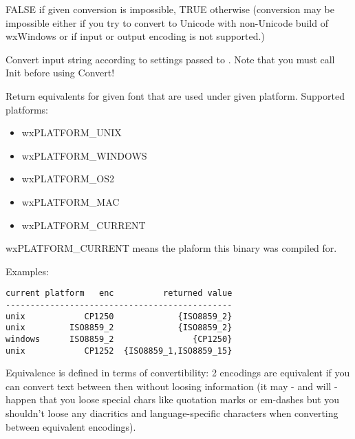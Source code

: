 
FALSE if given conversion is impossible, TRUE otherwise
(conversion may be impossible either if you try to convert
to Unicode with non-Unicode build of wxWindows or if input
or output encoding is not supported.)


\label{wxencodingconverterconvert}





Convert input string according to settings passed to .
Note that you must call Init before using Convert!



\label{wxencodingconvertergetplatformequivalents}


Return equivalents for given font that are used
under given platform. Supported platforms:

\begin{itemize}
\item wxPLATFORM\_UNIX
\item wxPLATFORM\_WINDOWS
\item wxPLATFORM\_OS2
\item wxPLATFORM\_MAC
\item wxPLATFORM\_CURRENT
\end{itemize}

wxPLATFORM\_CURRENT means the plaform this binary was compiled for.

Examples:
\begin{verbatim}
current platform   enc          returned value
----------------------------------------------
unix            CP1250             {ISO8859_2}
unix         ISO8859_2             {ISO8859_2}
windows      ISO8859_2                {CP1250}
unix            CP1252  {ISO8859_1,ISO8859_15}
\end{verbatim}

Equivalence is defined in terms of convertibility:
2 encodings are equivalent if you can convert text between
then without loosing information (it may - and will - happen
that you loose special chars like quotation marks or em-dashes
but you shouldn't loose any diacritics and language-specific
characters when converting between equivalent encodings).


